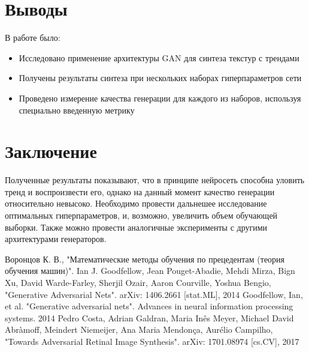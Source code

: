 \documentclass[a4paper]{article}
\begin{document}
	\section{Выводы}
		В работе было:
		\begin{itemize}
			\item Исследовано применение архитектуры GAN для синтеза текстур с трендами
			\item Получены результаты синтеза при нескольких наборах гиперпараметров сети
			\item Проведено измерение качества генерации для каждого из наборов, используя специально введенную метрику
		\end{itemize}
	\section{Заключение}
		Полученные результаты показывают, что в принципе нейросеть способна уловить тренд и воспроизвести его, однако на данный момент качество генерации относительно невысоко. Необходимо провести дальнешее исследование оптимальных гиперпараметров, и, возможно, увеличить объем обучающей выборки. Также можно провести аналогичные эксперименты с другими архитектурами генераторов.
	\begin{thebibliography}{99}
		  Воронцов К. В., "Математические методы обучения по прецедентам (теория обучения машин)".
		 Ian J. Goodfellow, Jean Pouget-Abadie, Mehdi Mirza, Bign Xu, David Warde-Farley, Sherjil Ozair, Aaron Courville, Yoshua Bengio, "Generative Adversarial Nets". arXiv: 1406.2661 [stat.ML], 2014
		 Goodfellow, Ian, et al. "Generative adversarial nets". Advances in neural information processing systems. 2014
		 Pedro Costa, Adrian Galdran, Maria Inês Meyer, Michael David Abràmoff, Meindert Niemeijer, Ana Maria Mendonça, Aurélio Campilho, "Towards Adversarial Retinal Image Synthesis". arXiv: 1701.08974 [cs.CV], 2017
	
\end{thebibliography}
\end{document}
